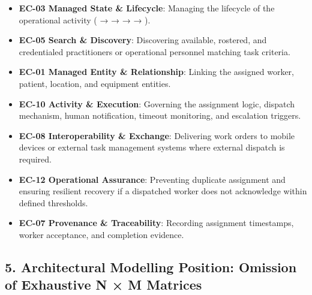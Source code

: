 \begin{itemize}
\begin{itemize}
\item 
\textbf{EC-03 Managed State \& Lifecycle}: Managing the lifecycle of the operational activity (\texttt{} → \texttt{} → \texttt{} → \texttt{} → \texttt{}).



\item 
\textbf{EC-05 Search \& Discovery}: Discovering available, rostered, and credentialed practitioners or operational personnel matching task criteria.



\item 
\textbf{EC-01 Managed Entity \& Relationship}: Linking the assigned worker, patient, location, and equipment entities.



\item 
\textbf{EC-10 Activity \& Execution}: Governing the assignment logic, dispatch mechanism, human notification, timeout monitoring, and escalation triggers.



\item 
\textbf{EC-08 Interoperability \& Exchange}: Delivering work orders to mobile devices or external task management systems where external dispatch is required.



\item 
\textbf{EC-12 Operational Assurance}: Preventing duplicate assignment and ensuring resilient recovery if a dispatched worker does not acknowledge within defined thresholds.



\item 
\textbf{EC-07 Provenance \& Traceability}: Recording assignment timestamps, worker acceptance, and completion evidence.



\end{itemize}


\end{itemize}
\label{rad:tier-model:254}

\par\smallskip
{}\label{rad:tier-model:256}
\subsection*{5. Architectural Modelling Position: Omission of Exhaustive N × M Matrices}
\label{rad:tier-model:258}

